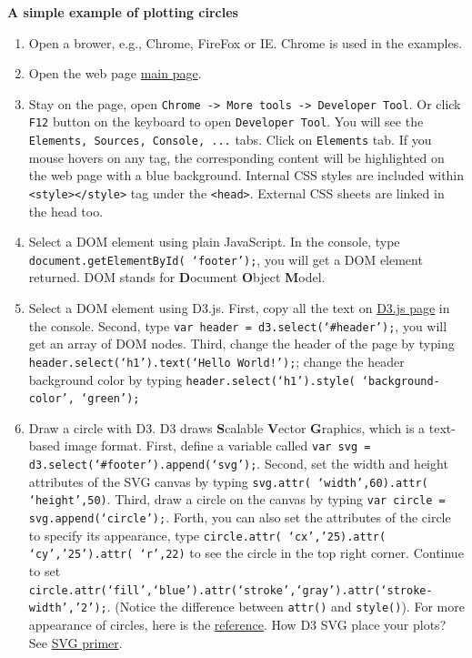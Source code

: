 \documentclass[a4paper, 11pt]{article}
\begin{document}
\textbf{A simple example of plotting circles}
\begin{enumerate}
\item Open a brower, e.g., Chrome, FireFox or IE. Chrome is used in the examples.
\item Open the web page \href{http://nymph332088.github.io/CIS4340/index.html}{main page}.
\item Stay on the page, open \texttt{Chrome -> More tools -> Developer Tool}. Or click \texttt{F12} button on the keyboard to open \texttt{Developer Tool}. You will see the \texttt{Elements, Sources, Console, ...} tabs. Click on \texttt{Elements} tab. If you mouse hovers on any tag, the corresponding content will be highlighted on the web page with a blue background. Internal CSS styles are included within \texttt{<style></style>} tag under the \texttt{<head>}. External CSS sheets are linked in the head too.
\item Select a DOM element using plain JavaScript. In the console, type \texttt{document.getElementById( `footer');}, you will get a DOM element returned. DOM stands for {\bf D}ocument {\bf O}bject {\bf M}odel.
\item Select a DOM element using D3.js. First, copy all the text on \href{https://raw.githubusercontent.com/mbostock/d3/master/d3.min.js}{D3.js page} in the console. Second, type \texttt{var header = d3.select(`\#{header}');}, you will get an array of DOM nodes. Third, change the header of the page by typing \texttt{header.select(`h1').text(`Hello World!');}; change the header background color by typing \texttt{header.select(`h1').style( `background-color', `green');}
\item Draw a circle with D3. D3 draws {\bf S}calable {\bf V}ector {\bf G}raphics, which is a text-based image format. First, define a variable called \texttt{var svg = d3.select(`\#{footer}').append(`svg');}. Second, set the width and height attributes of the SVG canvas by typing {\tt svg.attr( `width',60).attr( `height',50)}. Third, draw a circle on the canvas by typing \texttt{var circle = svg.append(`circle');}. Forth, you can also set the attributes of the circle to specify its appearance, type \texttt{circle.attr( `cx','25).attr( `cy','25').attr( `r',22)} to see the circle in the top right corner. Continue to set \texttt{circle.attr(`fill',`blue').attr(`stroke',`gray').attr(`stroke-width','2');}. (Notice the difference between \texttt{attr()} and \texttt{style()}). For more appearance of circles, here is the \href{http://alignedleft.com/tutorials/d3/an-svg-primer}{reference}. How D3 SVG place your plots? See \href{http://alignedleft.com/tutorials/d3/an-svg-primer}{SVG primer}.


\end{enumerate}
\end{document}
